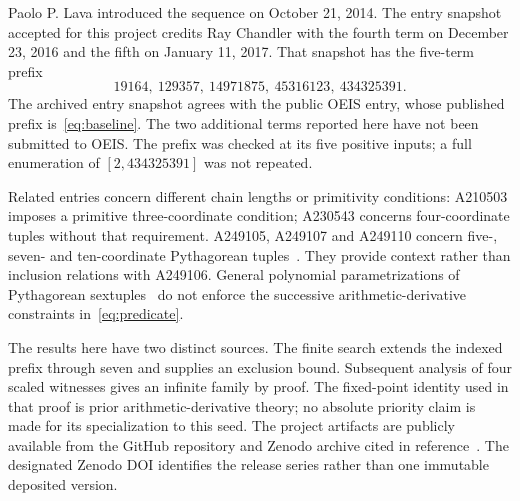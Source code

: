 \documentclass[11pt,a4paper]{article}
\theoremstyle{remark}
\begin{document}
Paolo P. Lava introduced the sequence on October 21, 2014. The entry snapshot
accepted for this project credits Ray Chandler with the fourth term on
December 23, 2016 and the fifth on January 11, 2017. That snapshot has the
five-term prefix
\begin{equation}\label{eq:baseline}
19164,\ 129357,\ 14971875,\ 45316123,\ 434325391.
\end{equation}
The archived entry snapshot agrees with the public OEIS entry, whose
published prefix is~\eqref{eq:baseline}. The two additional terms reported
here have not been submitted to OEIS.
The prefix was checked at its five positive inputs; a full enumeration of
$[2,434325391]$ was not repeated.

Related entries concern different chain lengths or primitivity conditions:
A210503 imposes a primitive three-coordinate condition; A230543 concerns
four-coordinate tuples without that requirement. A249105, A249107 and A249110
concern five-, seven- and ten-coordinate
Pythagorean tuples~\cite{related}. They provide context rather than inclusion
relations with A249106. General polynomial parametrizations of Pythagorean
sextuples~\cite{frisch} do not enforce the successive arithmetic-derivative
constraints in~\eqref{eq:predicate}.

The results here have two distinct sources. The finite search extends the
indexed prefix through seven and supplies an exclusion bound. Subsequent
analysis of four scaled witnesses gives an infinite family by proof. The
fixed-point identity used in that proof is prior arithmetic-derivative theory;
no absolute priority claim is made for its specialization to this seed.
The project artifacts are publicly available from the GitHub repository and
Zenodo archive cited in reference~\cite{project}. The designated Zenodo DOI
identifies the release series rather than one immutable deposited version.
\end{document}
